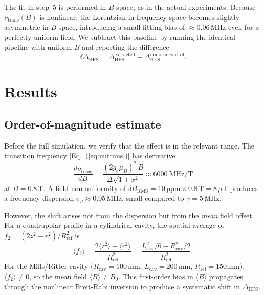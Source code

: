 \documentclass[twocolumn,pra,aps,superscriptaddress,floatfix,10pt]{revtex4-2}
\begin{document}
The fit in step~5 is performed in $B$-space, as in the actual experiments. Because $\nu_\mathrm{trans}(B)$ is nonlinear, the Lorentzian in frequency space becomes slightly asymmetric in $B$-space, introducing a small fitting bias of $\approx 0.06$\,MHz even for a perfectly uniform field. We subtract this baseline by running the identical pipeline with uniform $B$ and reporting the difference
\begin{equation}
  \delta\Delta_\mathrm{HFS} = \Delta_\mathrm{HFS}^\mathrm{extracted} - \Delta_\mathrm{HFS}^\mathrm{uniform\;control}.
  \label{eq:shift}
\end{equation}

\section{Results}
\label{sec:results}

\subsection{Order-of-magnitude estimate}
\label{sec:order_mag}

Before the full simulation, we verify that the effect is in the relevant range. The transition frequency [Eq.~(\ref{eq:nutrans})] has derivative
\begin{equation}
  \frac{d\nu_\mathrm{trans}}{dB} = \frac{(2g_e\mu_B)^2\,B}{\Delta\sqrt{1 + x^2}} \approx 6000~\mathrm{MHz/T}
\end{equation}
at $B = 0.8$\,T. A field non-uniformity of $\delta B_\mathrm{RMS} = 10\,\mathrm{ppm} \times 0.8\,\mathrm{T} = 8\,\mu$T produces a frequency dispersion $\sigma_\nu \approx 0.05$\,MHz, small compared to $\gamma = 5$\,MHz.

However, the shift arises not from the dispersion but from the \emph{mean} field offset. For a quadrupolar profile in a cylindrical cavity, the spatial average of $f_2 = (2z^2 - r^2)/R_\mathrm{ref}^2$ is
\begin{equation}
  \langle f_2 \rangle = \frac{2\langle z^2 \rangle - \langle r^2 \rangle}{R_\mathrm{ref}^2} = \frac{L_\mathrm{cav}^2/6 - R_\mathrm{cav}^2/2}{R_\mathrm{ref}^2}.
  \label{eq:mean_xi}
\end{equation}
For the Mills/Ritter cavity ($R_\mathrm{cav} = 100$\,mm, $L_\mathrm{cav} = 200$\,mm, $R_\mathrm{ref} = 150$\,mm), $\langle f_2 \rangle \neq 0$, so the mean field $\langle B \rangle \neq B_0$. This first-order bias in $\langle B \rangle$ propagates through the nonlinear Breit-Rabi inversion to produce a systematic shift in $\Delta_\mathrm{HFS}$.
\end{document}
